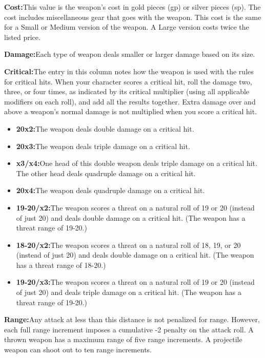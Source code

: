 {\noindent\textbf{Cost:}{This value is the weapon’s cost in gold pieces (gp) or silver pieces (sp). The cost includes miscellaneous gear that goes with the weapon. This cost is the same for a Small or Medium version of the weapon. A Large version costs twice the listed price.}

\noindent\textbf{Damage:}{Each type of weapon deals smaller or larger damage based on its size.}

\noindent\textbf{Critical:}{The entry in this column notes how the weapon is used with the rules for critical hits. When your character scores a critical hit, roll the damage two, three, or four times, as indicated by its critical multiplier (using all applicable modifiers on each roll), and add all the results together. Extra damage over and above a weapon’s normal damage is not multiplied when you score a critical hit.}

\begin{itemize}
  \item\noindent\textbf{20x2:}{The weapon deals double damage on a critical hit.}
  \item\noindent\textbf{20x3:}{The weapon deals triple damage on a critical hit.}
  \item\noindent\textbf{x3/x4:}{One head of this double weapon deals triple damage on a critical hit. The other head deals quadruple damage on a critical hit.}
  \item\noindent\textbf{20x4:}{The weapon deals quadruple damage on a critical hit.}
  \item\noindent\textbf{19-20/x2:}{The weapon scores a threat on a natural roll of 19 or 20 (instead of just 20) and deals double damage on a critical hit. (The weapon has a threat range of 19-20.)}
  \item\noindent\textbf{18-20/x2:}{The weapon scores a threat on a natural roll of 18, 19, or 20 (instead of just 20) and deals double damage on a critical hit. (The weapon has a threat range of 18-20.)}
  \item\noindent\textbf{19-20/x3:}{The weapon scores a threat on a natural roll of 19 or 20 (instead of just 20) and deals triple damage on a critical hit. (The weapon has a threat range of 19-20.)}
\end{itemize}

\noindent\textbf{Range:}{Any attack at less than this distance is not penalized for range. However, each full range increment imposes a cumulative -2 penalty on the attack roll. A thrown weapon has a maximum range of five range increments. A projectile weapon can shoot out to ten range increments.}

}
